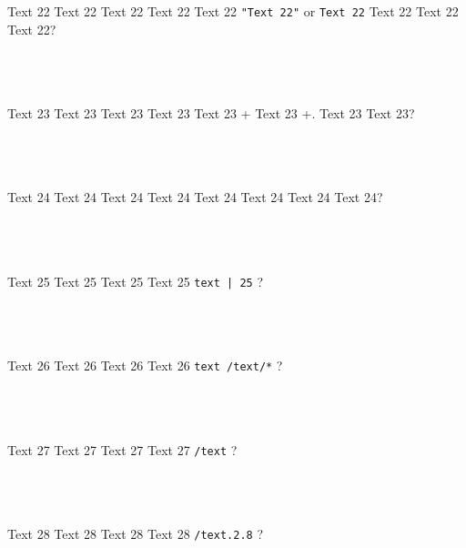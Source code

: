 \documentclass[9pt]{exam}
\begin{document}
\begin{questions}
\question
    Text 22 Text 22 Text 22 Text 22 Text 22 \texttt{"Text 22"}
    or
    \texttt{\textquotesingle{}Text 22\textquotesingle{}}
    Text 22 Text 22 Text 22?\\\\
    \makebox[0.9\textwidth]{\$ \enspace\hrulefill}\\\\
    \makebox[0.9\textwidth]{\enspace\hrulefill}

\question
    Text 23 Text 23 Text 23 Text 23 Text 23 \Ctrl+
    Text 23 \Ctrl+. Text 23 Text 23?\\\\
    \makebox[0.9\textwidth]{\$ \enspace\hrulefill}\\\\
    \makebox[0.9\textwidth]{\enspace\hrulefill}

\question
    Text 24 Text 24 Text 24 Text 24 Text 24 Text 24 Text 24 Text 24?\\\\
    \makebox[0.9\textwidth]{\$ \enspace\hrulefill}\\\\
    \makebox[0.9\textwidth]{\enspace\hrulefill}

\question
    Text 25 Text 25 Text 25 Text 25 \textquotesingle{}\texttt{text | 25}\textquotesingle{} ?\\\\
    \makebox[0.9\textwidth]{\$ \enspace\hrulefill}\\\\
    \makebox[0.9\textwidth]{\enspace\hrulefill}

\question
    Text 26 Text 26 Text 26 Text 26 \textquotesingle{}\texttt{text /text/*}\textquotesingle{} ?\\\\
    \makebox[0.9\textwidth]{\$ \enspace\hrulefill}\\\\
    \makebox[0.9\textwidth]{\enspace\hrulefill}

\question
    Text 27 Text 27 Text 27 Text 27 \texttt{/text} ?\\\\
    \makebox[0.9\textwidth]{\$ \enspace\hrulefill}\\\\
    \makebox[0.9\textwidth]{\enspace\hrulefill}

\question
    Text 28 Text 28 Text 28 Text 28 \texttt{/text.2.8} ?\\
    \makebox[0.9\textwidth]{\$ \enspace\hrulefill}\\\\
    \makebox[0.9\textwidth]{\enspace\hrulefill}


\end{questions}
\end{document}
